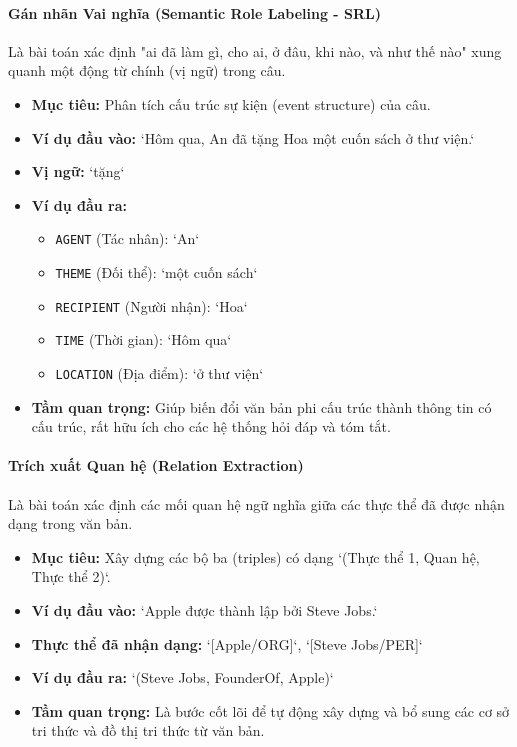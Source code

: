 \paragraph{Gán nhãn Vai nghĩa (Semantic Role Labeling - SRL)}
Là bài toán xác định "ai đã làm gì, cho ai, ở đâu, khi nào, và như thế nào" xung quanh một động từ chính (vị ngữ) trong câu.
\begin{itemize}
    \item \textbf{Mục tiêu:} Phân tích cấu trúc sự kiện (event structure) của câu.
    \item \textbf{Ví dụ đầu vào:} `Hôm qua, An đã tặng Hoa một cuốn sách ở thư viện.`
    \item \textbf{Vị ngữ:} `tặng`
    \item \textbf{Ví dụ đầu ra:}
        \begin{itemize}
            \item \texttt{AGENT} (Tác nhân): `An`
            \item \texttt{THEME} (Đối thể): `một cuốn sách`
            \item \texttt{RECIPIENT} (Người nhận): `Hoa`
            \item \texttt{TIME} (Thời gian): `Hôm qua`
            \item \texttt{LOCATION} (Địa điểm): `ở thư viện`
        \end{itemize}
    \item \textbf{Tầm quan trọng:} Giúp biến đổi văn bản phi cấu trúc thành thông tin có cấu trúc, rất hữu ích cho các hệ thống hỏi đáp và tóm tắt.
\end{itemize}

\paragraph{Trích xuất Quan hệ (Relation Extraction)}
Là bài toán xác định các mối quan hệ ngữ nghĩa giữa các thực thể đã được nhận dạng trong văn bản.
\begin{itemize}
    \item \textbf{Mục tiêu:} Xây dựng các bộ ba (triples) có dạng `(Thực thể 1, Quan hệ, Thực thể 2)`.
    \item \textbf{Ví dụ đầu vào:} `Apple được thành lập bởi Steve Jobs.`
    \item \textbf{Thực thể đã nhận dạng:} `[Apple/ORG]`, `[Steve Jobs/PER]`
    \item \textbf{Ví dụ đầu ra:} `(Steve Jobs, FounderOf, Apple)`
    \item \textbf{Tầm quan trọng:} Là bước cốt lõi để tự động xây dựng và bổ sung các cơ sở tri thức và đồ thị tri thức từ văn bản.
\end{itemize}

